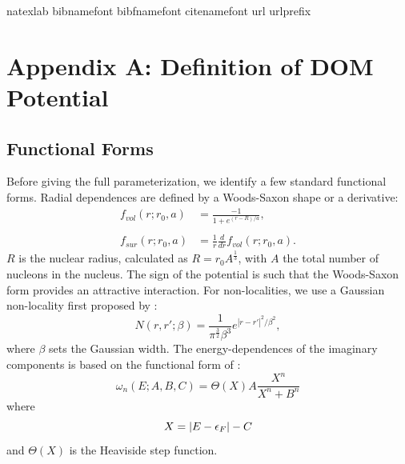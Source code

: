 \documentclass[twocolumn,secnumarabic,amssymb, nobibnotes, aps, prl,
superscriptaddress, nobalancelastpage, draft]{revtex4}
\begin{document}

\begin{thebibliography}{32} \expandafter\ifx\csname
        natexlab\endcsname\relax\def\natexlab#1{#1}\fi \expandafter\ifx\csname
        bibnamefont\endcsname\relax \def\bibnamefont#1{#1}\fi
        \expandafter\ifx\csname bibfnamefont\endcsname\relax
        \def\bibfnamefont#1{#1}\fi \expandafter\ifx\csname
        citenamefont\endcsname\relax \def\citenamefont#1{#1}\fi
        \expandafter\ifx\csname url\endcsname\relax \def\url#1{\texttt{#1}}\fi
        \expandafter\ifx\csname urlprefix\endcsname\relax\def\urlprefix{URL
        }\fi \providecommand{\bibinfo}[2]{#2}
        \providecommand{\eprint}[2][]{\url{#2}}
\end{thebibliography}

\clearpage
\appendix \label{DOMFunctionalForms}
\section{Appendix A: Definition of DOM Potential}
\subsection{Functional Forms}
Before giving the full parameterization, we identify a few standard functional
forms. Radial dependences are defined by a Woods-Saxon shape or a derivative:
\begin{equation} \label{WoodsSaxon}
    \begin{split}
        f_{vol}(r; r_{0}, a) & = \frac{-1}{1+e^{(r-R)/a}},\\
        \\
        f_{sur}(r; r_{0}, a) & = \frac{1}{r}\frac{d}{dr}f_{vol}(r; r_{0}, a).
    \end{split}
\end{equation}
$R$ is the nuclear radius, calculated as $R = r_{0}A^{\frac{1}{3}}$, with $A$ the total number of
nucleons in the nucleus. The sign of the potential is such that the Woods-Saxon form
provides an attractive interaction. For non-localities, we use a Gaussian
non-locality first proposed by \cite{Perey1962}:
\begin{equation}
    N(r, r';\beta) = \frac{1}{\pi^{\frac{3}{2}}\beta^{3}}
    e^{|r-r'|^{2}/{\beta^{2}}},
\end{equation}
where $\beta$ sets the Gaussian width.
The energy-dependences of the imaginary components is based on the functional form of \cite{Charity2006}:
\begin{equation} \label{omega}
    \omega_{n}(E; A, B, C) = \Theta(X)A\frac{X^{n}}{X^{n}+B^{n}}
\end{equation}
where
\begin{equation*}
    X = |E-\epsilon_{F}|-C\\
\end{equation*}
and $\Theta(X)$ is the Heaviside step function. 
\end{document}
